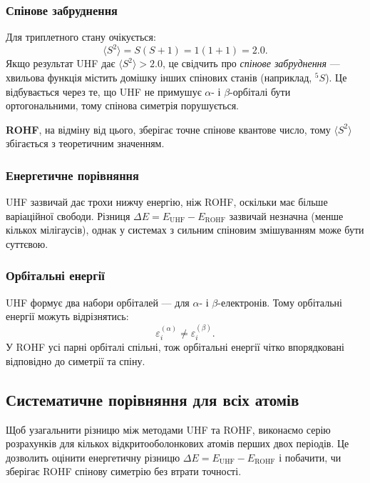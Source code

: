 \subsubsection{Спінове забруднення}

Для триплетного стану очікується:
\[
    \langle S^2 \rangle = S(S+1) = 1(1+1) = 2.0.
\]
Якщо результат UHF дає $\langle S^2 \rangle > 2.0$, це свідчить про \textit{спінове забруднення} --- хвильова функція містить домішку інших спінових станів (наприклад, $^5S$).
Це відбувається через те, що UHF не примушує $\alpha$- і $\beta$-орбіталі бути ортогональними, тому спінова симетрія порушується.

\textbf{ROHF}, на відміну від цього, зберігає точне спінове квантове число, тому $\langle S^2 \rangle$ збігається з теоретичним значенням.

\subsubsection{Енергетичне порівняння}

UHF зазвичай дає трохи нижчу енергію, ніж ROHF, оскільки має більше варіаційної свободи.
Різниця $\Delta E = E_{\mathrm{UHF}} - E_{\mathrm{ROHF}}$ зазвичай незначна (менше кількох мілігаусів), однак у системах з сильним спіновим змішуванням може бути суттєвою.

\subsubsection{Орбітальні енергії}

UHF формує два набори орбіталей --- для $\alpha$- і $\beta$-електронів.
Тому орбітальні енергії можуть відрізнятись:
\[
    \varepsilon_i^{(\alpha)} \neq \varepsilon_i^{(\beta)}.
\]
У ROHF усі парні орбіталі спільні, тож орбітальні енергії чітко впорядковані відповідно до симетрії та спіну.


\subsection{Систематичне порівняння для всіх атомів}

Щоб узагальнити різницю між методами UHF та ROHF, виконаємо серію розрахунків для
кількох відкритооболонкових атомів перших двох періодів. Це дозволить оцінити
енергетичну різницю $\Delta E = E_{\text{UHF}} - E_{\text{ROHF}}$ і побачити,
чи зберігає ROHF спінову симетрію без втрати точності.



